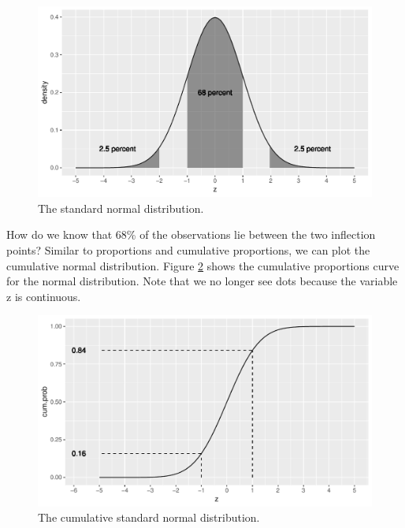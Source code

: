 \documentclass[]{report}\usepackage[]{graphicx}\usepackage[]{color}
\makeatletter
\def\maxwidth{ %
  \ifdim\Gin@nat@width>\linewidth
    \linewidth
  \else
    \Gin@nat@width
  \fi
}
\newenvironment{knitrout}{}{} %
\makeatother
\begin{document}
\begin{knitrout}
\color{fgcolor}\begin{figure}

{\centering \includegraphics[width=\maxwidth]{figure/normal_2-1} 

}

\caption[The standard normal distribution]{The standard normal distribution.}\label{fig:normal_2}
\end{figure}


\end{knitrout}

How do we know that 68\% of the observations lie between the two inflection points? Similar to proportions and cumulative proportions, we can plot the cumulative normal distribution. Figure \ref{fig:normal_3} shows the cumulative proportions curve for the normal distribution. Note that we no longer see dots because the variable z is continuous.

\begin{knitrout}
\color{fgcolor}\begin{figure}

{\centering \includegraphics[width=\maxwidth]{figure/normal_3-1} 

}

\caption[The cumulative standard normal distribution]{The cumulative standard normal distribution.}\label{fig:normal_3}
\end{figure}


\end{knitrout}
\end{document}
